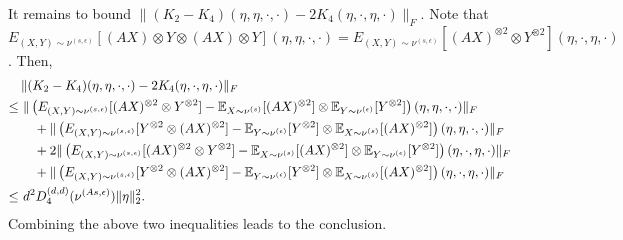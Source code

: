 It remains to bound $\|(K_2-K_4)(\eta,\eta,\cdot, \cdot) - 2K_4(\eta,\cdot,\eta,\cdot)\|_F$. 
Note that $E_{(X,Y)\sim \nu^{(s,\epsilon)}} [ (AX)\otimes Y\otimes (AX)\otimes Y](\eta,\eta,\cdot,\cdot)  = E_{(X,Y)\sim \nu^{(s,\epsilon)}} [ (AX)^{\otimes 2}\otimes Y^{\otimes 2}](\eta,\cdot,\eta,\cdot)$. Then,
\begin{align*}
& \|(K_2-K_4)(\eta,\eta,\cdot, \cdot) - 2K_4(\eta,\cdot,\eta,\cdot)\|_F \\
\le\,  & \,\|\left( E_{(X,Y)\sim \nu^{(s,\epsilon)}} [ (AX)^{\otimes 2}\otimes Y^{\otimes 2}]- \mathbb{E}_{X\sim \nu^{(s)}}[(AX)^{\otimes 2}] \otimes \mathbb{E}_{Y\sim \nu^{(\epsilon)}}[Y^{\otimes 2}]\right)(\eta,\eta,\cdot,\cdot)\|_F \\
& \quad + \|\left( E_{(X,Y)\sim \nu^{(s,\epsilon)}} [ Y^{\otimes 2}\otimes (AX)^{\otimes 2}]- \mathbb{E}_{Y\sim \nu^{(\epsilon)}}[Y^{\otimes 2}] \otimes \mathbb{E}_{X\sim \nu^{(s)}}[(AX)^{\otimes 2}]\right)(\eta,\eta,\cdot,\cdot)\|_F \\
& \quad + 2\|\left( E_{(X,Y)\sim \nu^{(s,\epsilon)}} [ (AX)^{\otimes 2}\otimes Y^{\otimes 2}]- \mathbb{E}_{X\sim \nu^{(s)}}[(AX)^{\otimes 2}] \otimes \mathbb{E}_{Y\sim \nu^{(\epsilon)}}[Y^{\otimes 2}]\right)(\eta,\cdot,\eta,\cdot)\|_F \\
& \quad + \|\left( E_{(X,Y)\sim \nu^{(s,\epsilon)}} [ Y^{\otimes 2}\otimes (AX)^{\otimes 2}]- \mathbb{E}_{Y\sim \nu^{(\epsilon)}}[Y^{\otimes 2}] \otimes \mathbb{E}_{X\sim \nu^{(s)}}[(AX)^{\otimes 2}]\right)(\eta,\cdot,\eta, \cdot)\|_F \\
\le \, &\,   d^2D_4^{(d,d)}(\nu^{(As,\epsilon)})\|\eta\|^2_2. 
\end{align*}
Combining the above two inequalities leads to the conclusion.


